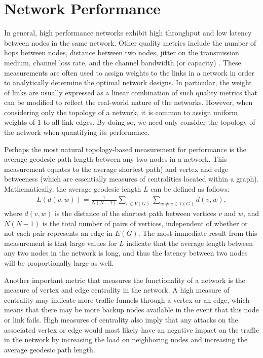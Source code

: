 \documentclass[doc]{apa}%
\begin{document}
\section{Network Performance}
\label{NetworkFunctionality}

In general, high performance networks exhibit high throughput and low latency between nodes in the same network. Other quality metrics include the number of hops between nodes, distance between two nodes, jitter on the transmission medium, channel loss rate, and the channel bandwidth (or capacity) \cite{LargeNetworkRobustnessPVM}. These measurements are often used to assign weights to the links in a network in order to analytically determine the optimal network designs. In particular, the weight of links are usually expressed as a linear combination of such quality metrics that can be modified to reflect the real-world nature of the networks. However, when considering only the topology of a network, it is common to assign uniform weights of $1$ to all link edges. By doing so, we need only consider the topology of the network when quantifying its performance. 

Perhaps the most natural topology-based measurement for performance is the average geodesic path length between any two nodes in a network. This measurement equates to the average shortest path) and vertex and edge betweeness (which are essentially measures of centralities located within a graph). Mathematically, the average geodesic length $L$ can be defined as follows:
\begin{eqnarray}
L(d(v,w)) = \frac{1}{N(N-1)}\sum_{v \in V(G)}\sum_{w \not= v \in V(G)} d(v,w),
\end{eqnarray}
where $d(v,w)$ is the distance of the shortest path between vertices $v$ and $w$, and $N(N-1)$ is the total number of pairs of vertices, independent of whether or not each pair represents an edge in $E(G)$. The most immediate result from this measurement is that large values for $L$ indicate that the average length between any two nodes in the network is long, and thus the latency between two nodes will be proportionally large as well. 

Another important metric that measures the functionality of a network is the measure of vertex and edge centrality in the network. A high measure of centrality may indicate more traffic funnels through a vertex or an edge, which means that there may be more backup nodes available in the event that this node or link fails. High measures of centrality also imply that any attacks on the associated vertex or edge would most likely have an negative impact on the traffic in the network by increasing the load on neighboring nodes and increasing the average geodesic path length. 
\end{document}

